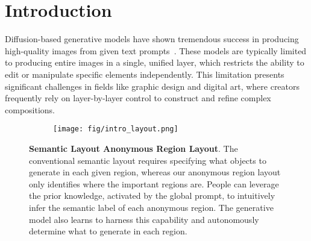 \section{Introduction}
\label{sec:intro}

Diffusion-based generative models have shown tremendous success in producing high-quality images from given text prompts~\cite{podell2023sdxl,esser2024scaling,betker2023improving,saharia2022photorealistic}. These models are typically limited to producing entire images in a single, unified layer, which restricts the ability to edit or manipulate specific elements independently. This limitation presents significant challenges in fields like graphic design and digital art, where creators frequently rely on layer-by-layer control to construct and refine complex compositions.

\begin{figure}[!t]
\begin{minipage}[!t]{1\linewidth}
\begin{subfigure}[b]{1\textwidth}
\centering
\texttt{[image: fig/intro\_layout.png]}
\vspace{-3mm}
\end{subfigure}
\end{minipage}
\vspace{-3mm}
\caption{\footnotesize{\textbf{Semantic Layout \vs Anonymous Region Layout}. The conventional semantic layout requires specifying what objects to generate in each given region, whereas our anonymous region layout only identifies where the important regions are. 
People can leverage the prior knowledge, activated by the global prompt, to intuitively infer the semantic label of each anonymous region. The generative model also learns to harness this capability and autonomously determine what to generate in each region.
}}
\label{fig:anonymous_layout}
\vspace{-3mm}
\end{figure}

